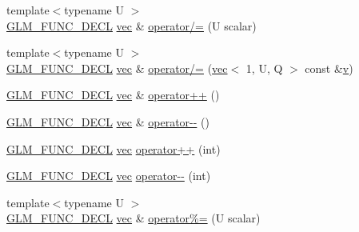 \begin{DoxyCompactItemize}
\item 
{\footnotesize template$<$typename U $>$ }\\\mbox{\hyperlink{setup_8hpp_ab2d052de21a70539923e9bcbf6e83a51}{G\+L\+M\+\_\+\+F\+U\+N\+C\+\_\+\+D\+E\+CL}} \mbox{\hyperlink{structglm_1_1vec}{vec}} \& \mbox{\hyperlink{structglm_1_1vec_3_011_00_01_t_00_01_q_01_4_a0b6b057cf632327a79e33dc759773855}{operator/=}} (U scalar)
\item 
{\footnotesize template$<$typename U $>$ }\\\mbox{\hyperlink{setup_8hpp_ab2d052de21a70539923e9bcbf6e83a51}{G\+L\+M\+\_\+\+F\+U\+N\+C\+\_\+\+D\+E\+CL}} \mbox{\hyperlink{structglm_1_1vec}{vec}} \& \mbox{\hyperlink{structglm_1_1vec_3_011_00_01_t_00_01_q_01_4_a9ecfce3e3f712d4735f00bb4250d0f76}{operator/=}} (\mbox{\hyperlink{structglm_1_1vec}{vec}}$<$ 1, U, Q $>$ const \&\mbox{\hyperlink{_s_d_l__opengl_8h_a10a82eabcb59d2fcd74acee063775f90}{v}})
\item 
\mbox{\hyperlink{setup_8hpp_ab2d052de21a70539923e9bcbf6e83a51}{G\+L\+M\+\_\+\+F\+U\+N\+C\+\_\+\+D\+E\+CL}} \mbox{\hyperlink{structglm_1_1vec}{vec}} \& \mbox{\hyperlink{structglm_1_1vec_3_011_00_01_t_00_01_q_01_4_a987d92f70c9541002ae2b696f06947f0}{operator++}} ()
\item 
\mbox{\hyperlink{setup_8hpp_ab2d052de21a70539923e9bcbf6e83a51}{G\+L\+M\+\_\+\+F\+U\+N\+C\+\_\+\+D\+E\+CL}} \mbox{\hyperlink{structglm_1_1vec}{vec}} \& \mbox{\hyperlink{structglm_1_1vec_3_011_00_01_t_00_01_q_01_4_aeae2b05422c154000e72b90a08afdd13}{operator-\/-\/}} ()
\item 
\mbox{\hyperlink{setup_8hpp_ab2d052de21a70539923e9bcbf6e83a51}{G\+L\+M\+\_\+\+F\+U\+N\+C\+\_\+\+D\+E\+CL}} \mbox{\hyperlink{structglm_1_1vec}{vec}} \mbox{\hyperlink{structglm_1_1vec_3_011_00_01_t_00_01_q_01_4_aa829fdf00e136856718ce8c37b43d507}{operator++}} (int)
\item 
\mbox{\hyperlink{setup_8hpp_ab2d052de21a70539923e9bcbf6e83a51}{G\+L\+M\+\_\+\+F\+U\+N\+C\+\_\+\+D\+E\+CL}} \mbox{\hyperlink{structglm_1_1vec}{vec}} \mbox{\hyperlink{structglm_1_1vec_3_011_00_01_t_00_01_q_01_4_a5a8b3c0ef842a37c2ac49e9828231e6f}{operator-\/-\/}} (int)
\item 
{\footnotesize template$<$typename U $>$ }\\\mbox{\hyperlink{setup_8hpp_ab2d052de21a70539923e9bcbf6e83a51}{G\+L\+M\+\_\+\+F\+U\+N\+C\+\_\+\+D\+E\+CL}} \mbox{\hyperlink{structglm_1_1vec}{vec}} \& \mbox{\hyperlink{structglm_1_1vec_3_011_00_01_t_00_01_q_01_4_adfee0c8240cd43f82360a4a1910015f6}{operator\%=}} (U scalar)
\item 

\end{DoxyCompactItemize}
